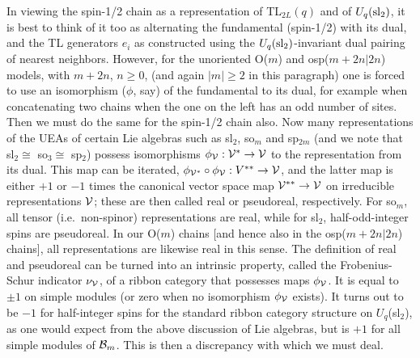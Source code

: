 \documentclass[twocolumn,floats,pra]{revtex4}
\begin{document}
In viewing the spin-1/2 chain as a representation of TL$_{2L}(q)$
and of $U_q({\rm sl}_2)$, it is best to think of it too as
alternating the fundamental (spin-1/2) with its dual, and the TL
generators $e_i$ as constructed using the $U_q({\rm
sl}_2)$-invariant dual pairing of nearest neighbors. However, for
the unoriented O($m$) and osp($m+2n|2n$) models, with $m+2n$,
$n\geq 0$, (and again $|m|\geq 2$ in this paragraph) one is forced
to use an isomorphism ($\phi$, say) of the fundamental to its
dual, for example when concatenating two chains when the one on
the left has an odd number of sites. Then we must do the same for
the spin-1/2 chain also. Now many representations of the UEAs of
certain Lie algebras such as sl$_2$, so$_m$ and sp$_{2m}$ (and we
note that sl$_2\cong$ so$_3\cong$ sp$_2$) possess isomorphisms
$\phi_{\cal V}:{\cal V}^*\to{\cal V}$ to the representation from
its dual. This map can be iterated, $\phi_{{\cal
V}^*}\circ\phi_{\cal V}:V^{**}\to{\cal V}$, and the latter map is
either $+1$ or $-1$ times the canonical vector space map ${\cal
V}^{**}\to{\cal V}$ on irreducible representations $\cal V$; these
are then called real or pseudoreal, respectively. For so$_m$, all
tensor (i.e.\ non-spinor) representations are real, while for
sl$_2$, half-odd-integer spins are pseudoreal. In our O($m$)
chains [and hence also in the osp($m+2n|2n$) chains], all
representations are likewise real in this sense. The definition of
real and pseudoreal can be turned into an intrinsic property,
called the Frobenius-Schur indicator $\nu_{\cal V}$, of a ribbon
category that possesses maps $\phi_{\cal V}$. It is equal to $\pm
1$ on simple modules (or zero when no isomorphism $\phi_{\cal V}$
exists). It turns out to be $-1$ for half-integer spins for the
standard ribbon category structure on $U_q$(sl$_2$), as one would
expect from the above discussion of Lie algebras, but is $+1$ for
all simple modules of ${\cal B}_m$. This is then a discrepancy
with which we must deal.
\end{document}
